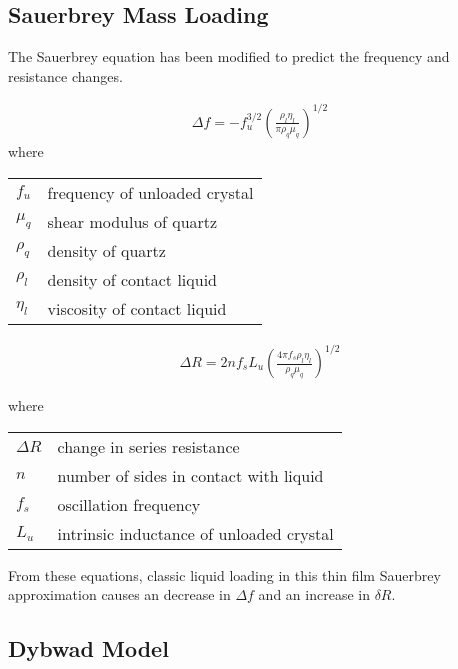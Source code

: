 \documentclass[a4paper]{article}
\begin{document}
\subsection{Sauerbrey Mass Loading}
The Sauerbrey equation has been modified to predict the frequency and
resistance changes.

\begin{align}
 \Delta f = -f_u^{3/2} \left(\frac{\rho_l \eta_l}{\pi \rho_q \mu_q}\right)^{1/2}
\end{align}
where

\begin{tabular}{ll}
$f_u$     & frequency of unloaded crystal \\
$\mu_q$   & shear modulus of quartz \\
$\rho_q$  & density of quartz \\
$\rho_l$  & density of contact liquid \\
$\eta_l$   & viscosity of contact liquid
\end{tabular}

\begin{align}
 \Delta R = 2 n f_s L_u \left(\frac{4 \pi f_s \rho_l \eta_l}{\rho_q \mu_q}\right)^{1/2}
\end{align}

where
\begin{tabular}{ll}
$\Delta R$ & change in series resistance \\
$n$        & number of sides in contact with liquid \\
$f_s$      & oscillation frequency \\
$L_u$      & intrinsic inductance of unloaded crystal \\
\end{tabular}

From these equations, classic liquid loading in this thin film Sauerbrey
approximation causes an decrease in $\Delta f$ and an increase in $\delta
R$.

\subsection{Dybwad Model}
\end{document}
